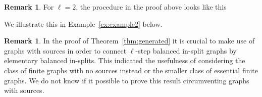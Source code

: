 \documentclass[12pt,a4paper,oneside,reqno,final]{amsart}
\theoremstyle{definition}
\newtheorem{remark}[lemma]{Remark}
\numberwithin{equation}{section} %
\begin{document}
\begin{remark}\label{rem:picture}
For $\ell = 2$, the procedure in the proof above looks like this
\begin{figure}[H]
    \begin{center}
    \end{center}
\end{figure}
\noindent We illustrate this in Example~\ref{ex:example2} below.
\end{remark}

\begin{remark}
    In the proof of Theorem~\ref{thm:generated} it is crucial to make use of graphs with sources in order to connect $\ell$-step balanced in-split graphs by elementary balanced in-splits.
    This indicated the usefulness of considering the class of finite graphs with no sources instead or the smaller class of essential finite graphs.
    We do not know if it possible to prove this result circumventing graphs with sources.
\end{remark}
\end{document}
